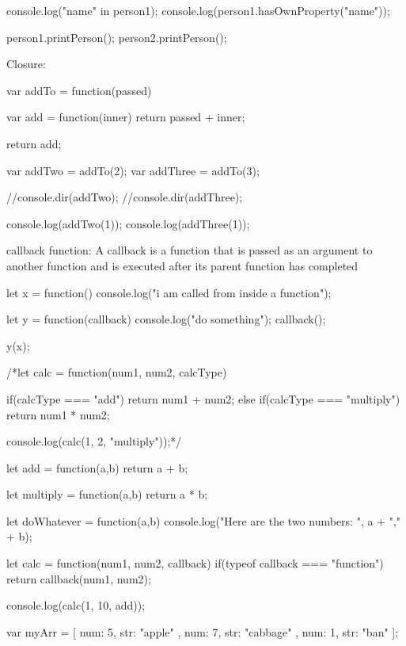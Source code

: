 \documentclass[a4paper,12pt]{article}
\begin{document}
\begin{description}
\begin{jscode}
console.log("name" in person1);
console.log(person1.hasOwnProperty("name"));

person1.printPerson();
person2.printPerson();
\end{jscode}

\item Closure:
\begin{jscode}
var addTo = function(passed){

	var add = function(inner){
		return passed + inner;
	}

	return add;
}

var addTwo = addTo(2);
var addThree = addTo(3);

//console.dir(addTwo);
//console.dir(addThree);

console.log(addTwo(1));
console.log(addThree(1));
\end{jscode}

\item callback function: A callback is a function that is passed as an argument to another function and is executed after its parent function has completed
\begin{jscode}
let x = function(){
	console.log("i am called from inside a function");
}

let y = function(callback){
	console.log("do something");
	callback();
}

y(x);
\end{jscode}
\begin{jscode}
/*let calc = function(num1, num2, calcType){

	if(calcType === "add"){
		return num1 + num2;
	}else if(calcType === "multiply"){
		return num1 * num2;
	}

}

console.log(calc(1, 2, "multiply"));*/

let add = function(a,b){
	return a + b;
}

let multiply = function(a,b){
	return a * b;
}

let doWhatever = function(a,b){
	console.log("Here are the two numbers: ", a + "," + b);
}

let calc = function(num1, num2, callback){
	if(typeof callback === "function"){
		return callback(num1, num2);
	}
}

console.log(calc(1, 10, add));
\end{jscode}

\begin{jscode}
var myArr = [{
	num: 5,
	str: "apple"
},{
	num: 7,
	str: "cabbage"
},{
	num: 1,
	str: "ban"
}];


\end{jscode}
\end{description}
\end{document}

